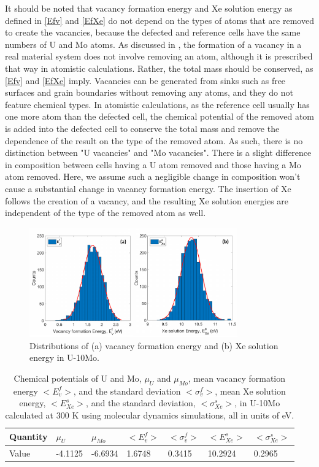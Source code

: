 \documentclass[review]{elsarticle}
\begin{document}
It should be noted that vacancy formation energy and Xe solution energy as defined in \cref{Efv} and \cref{EfXe} do not depend on the types of atoms that are removed to create the vacancies, because the defected and reference cells have the same numbers of U and Mo atoms. As discussed in \cite{zhang2021,morgan2020}, the formation of a vacancy in a real material system does not involve removing an atom, although it is prescribed that way in atomistic calculations. Rather, the total mass should be conserved, as \cref{Efv} and \cref{EfXe} imply. Vacancies can be generated from sinks such as free surfaces and grain boundaries without removing any atoms, and they do not feature chemical types. In atomistic calculations, as the reference cell usually has one more atom than the defected cell, the chemical potential of the removed atom is added into the defected cell to conserve the total mass and remove the dependence of the result on the type of the removed atom. As such, there is no distinction between "U vacancies" and "Mo vacancies". There is a slight difference in composition between cells having a U atom removed and those having a Mo atom removed. Here, we assume such a negligible change in composition won’t cause a substantial change in vacancy formation energy. The insertion of Xe follows the creation of a vacancy, and the resulting Xe solution energies are independent of the type of the removed atom as well. 

\begin{figure}[h!]
 \centering
 \includegraphics[width=0.8\textwidth]{EvF} 
 \caption{Distributions of (a) vacancy formation energy and (b) Xe solution energy in U-10Mo. }
 \label{fig:Evf}
\end{figure}

\begin{table}[h!]
\centering
\begin{tabular}{|l|l|l|l|l|l|l|}
\hline
Quantity & $\mu_U$ & $\mu_{Mo}$ & $<E^f_v>$      & $<\sigma^f_v>$      & $<E^s_{Xe}>$       & $<\sigma^s_{Xe}>$      \\ \hline
Value    & -4.1125 & -6.6934     & 1.6748         & 0.3415              & 10.2924           & 0.2965 \\ \hline
\end{tabular}
\caption{Chemical potentials of U and Mo, $\mu_U$ and $\mu_{Mo}$, mean vacancy formation energy $<E^f_v>$, and the standard deviation $<\sigma^f_v>$, mean Xe solution energy, $<E^s_{Xe}>$, and the standard deviation, $<\sigma^s_{Xe}>$, in U-10Mo calculated at 300 K using molecular dynamics simulations, all in units of eV.}\label{Table:EfV}
\end{table}
\end{document}
